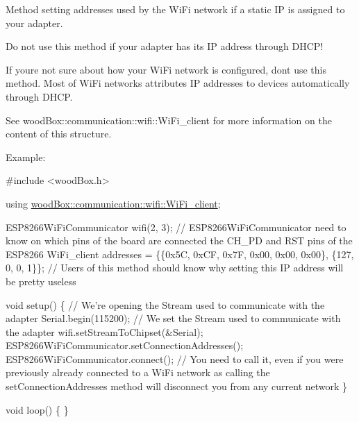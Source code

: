 Method setting addresses used by the Wi\+Fi network if a static IP is assigned to your adapter.

Do not use this method if your adapter has its IP address through D\+H\+C\+P!

If you\textquotesingle{}re not sure about how your Wi\+Fi network is configured, don\textquotesingle{}t use this method. Most of Wi\+Fi networks attributes IP addresses to devices automatically through D\+H\+CP.

See wood\+Box\+::communication\+::wifi\+::\+Wi\+Fi\+\_\+client for more information on the content of this structure.

Example\+:


\begin{DoxyCode}
\textcolor{preprocessor}{#include <woodBox.h>}

\textcolor{keyword}{using} \mbox{\hyperlink{structwood_box_1_1communication_1_1wifi_1_1s__wifi__client}{woodBox::communication::wifi::WiFi\_client}};

ESP8266WiFiCommunicator wifi(2, 3); \textcolor{comment}{// ESP8266WiFiCommunicator need to know on which pins of the board are
       connected the CH\_PD and RST pins of the ESP8266}
WiFi\_client addresses = \{\{0x5C, 0xCF, 0x7F, 0x00, 0x00, 0x00\}, \{127, 0, 0, 1\}\}; \textcolor{comment}{// Users of this method
       should know why setting this IP address will be pretty useless}

\textcolor{keywordtype}{void} setup() \{
  \textcolor{comment}{// We're opening the Stream used to communicate with the adapter}
  Serial.begin(115200);
  \textcolor{comment}{// We set the Stream used to communicate with the adapter}
  wifi.setStreamToChipset(&Serial);
  ESP8266WiFiCommunicator.setConnectionAddresses();
  ESP8266WiFiCommunicator.connect(); \textcolor{comment}{// You need to call it, even if you were previously already connected
       to a WiFi network as calling the setConnectionAddresses method will disconnect you from any current network}
\}

\textcolor{keywordtype}{void} loop() \{
\}
\end{DoxyCode}
 \mbox{\label{classwood_box_1_1communication_1_1wifi_1_1_a_wi_fi_communicator_a1bbe3367296c647d6846b3c7d0313261}} 
